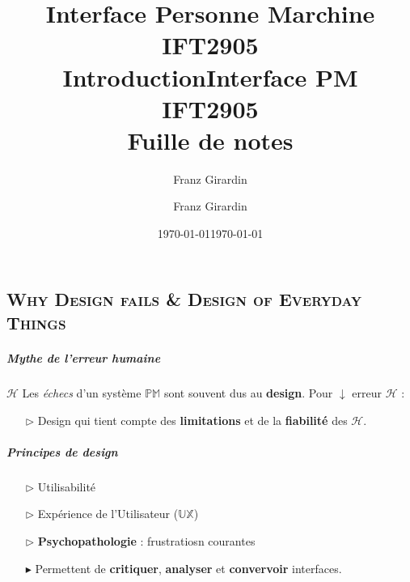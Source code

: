 \documentclass{report}
\title{\Huge{Interface Personne Marchine}\\{IFT2905}\\{\textbf{Introduction}}}
\author{\huge{Franz Girardin}}
\date{\today}
\title{\Huge{Interface PM}\\{IFT2905}\\{\textbf{Fuille de notes}}}
\author{\huge{Franz Girardin}}
\date{\today}
\begin{document}
\maketitle
\pagebreak
\tableofcontents
\pagebreak
\begin{multicols*}{3}


    \footnotesize

    \chapter{\textsc{Why Design fails \& Design of Everyday Things}}


    \paragraph{Mythe de l'erreur humaine} $\mathcal{H}$   
    Les \textit{échecs} d'un système $\mathbb{PM}$ sont souvent dus  
    au \textbf{design}. Pour $\downarrow$ erreur $\mathcal{H}$ : 
    \begin{itemize}
        \item[$\rhd$ ] Design qui tient compte des \textbf{limitations}
            et de la \textbf{fiabilité} des $\mathcal{H}$.   
    \end{itemize}

    \paragraph{Principes de design}
    \begin{itemize}
        \item[$\rhd$] Utilisabilité
        \item[$\rhd$] Expérience de l'Utilisateur ($\mathbb{UX}$)
        \item[$\rhd$] \textbf{Psychopathologie} : frustratiosn courantes  
         \item[$\blacktriangleright$] Permettent de 
             \textbf{critiquer}, \textbf{analyser} et \textbf{convervoir} interfaces.     

    \end{itemize}



\end{multicols*}
\end{document}
